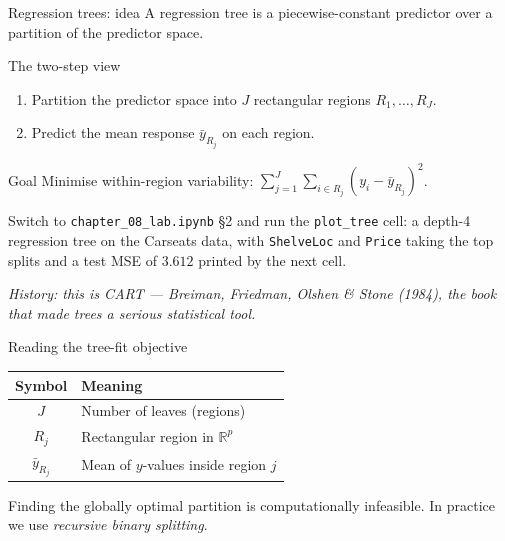 \documentclass[aspectratio=169,11pt]{beamer}
\begin{document}
\begin{frame}{Regression trees: idea}
  A regression tree is a piecewise-constant predictor over a partition
  of the predictor space.
  \begin{block}{The two-step view}
    \begin{enumerate}
      \item Partition the predictor space into $J$ rectangular regions
            $R_1, \ldots, R_J$.
      \item Predict the mean response $\bar y_{R_j}$ on each region.
    \end{enumerate}
  \end{block}
  \begin{block}{Goal}
    Minimise within-region variability:
    $\sum_{j = 1}^J \sum_{i \in R_j} (y_i - \bar y_{R_j})^2$.
  \end{block}
  \begin{labnote}
    Switch to \texttt{chapter\_08\_lab.ipynb} \S2 and run the \texttt{plot\_tree} cell: a depth-4 regression tree on the Carseats data, with \texttt{ShelveLoc} and \texttt{Price} taking the top splits and a test MSE of $3.612$ printed by the next cell.
  \end{labnote}
  \par{\tiny\itshape\color{gray}History: this is CART --- Breiman,
  Friedman, Olshen \& Stone (1984), the book that made trees a serious
  statistical tool.}
\end{frame}

\begin{frame}{Reading the tree-fit objective}
  \begin{readme}
    \begin{tabular}{@{}cl@{}}
      \toprule
      \textbf{Symbol} & \textbf{Meaning} \\
      \midrule
      $J$ & Number of leaves (regions) \\
      $R_j$ & Rectangular region in $\mathbb{R}^p$ \\
      $\bar y_{R_j}$ & Mean of $y$-values inside region $j$ \\
      \bottomrule
    \end{tabular}
  \end{readme}
  \begin{takeaway}
    Finding the globally optimal partition is computationally
    infeasible. In practice we use \emph{recursive binary splitting}.
  \end{takeaway}
\end{frame}
\end{document}
